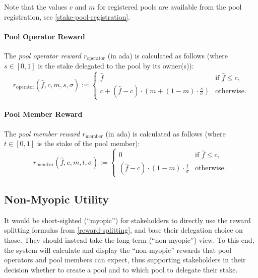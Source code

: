 \documentclass[11pt,a4paper,dvipsnames,twosided]{article}
\begin{document}
Note that the values \(c\) and \(m\) for registered pools are available
from the pool registration, see \cref{stake-pool-registration}.

\paragraph{Pool Operator Reward}
\label{pool-operator-reward}

The \emph{pool operator reward \(r_\mathrm{operator}\)} (in ada) is calculated
as follows (where \(s\in[0,1]\) is the stake delegated to the pool by its
owner(s)):
\[ r_\mathrm{operator}(\hat{f}, c, m, s, \sigma) := \left\{
    \begin{array}{ll}
        \displaystyle\hat{f} &
        \text{if $\hat{f}\leq c$,} \\
        \displaystyle c + (\hat{f} - c)\cdot\left(m + (1-m)\cdot\frac{s}{\sigma}\right) &
        \text{otherwise.}
    \end{array}
    \right.
\]

\paragraph{Pool Member Reward}
\label{pool-member-reward}

The \emph{pool member reward \(r_\mathrm{member}\)} (in ada) is
calculated as follows (where \(t\in[0,1]\) is the stake of the pool
member): \[
    r_\mathrm{member}(\hat{f}, c, m, t, \sigma) :=
    \left\{
    \begin{array}{ll}
        \displaystyle 0 &
        \text{if $\hat{f}\leq c$,} \\
        \displaystyle (\hat{f} - c)\cdot(1-m)\cdot\frac{t}{\sigma} &
        \text{otherwise.}
    \end{array}
    \right.
\]

\subsection{Non-Myopic Utility}
\label{non-myopic-utility}

It would be short-sighted (``myopic'') for stakeholders to directly use the
reward splitting formulas from \cref{reward-splitting}, and base their
delegation choice on those. They should instead take the long-term
(``non-myopic'') view. To this end, the system will calculate and display the
``non-myopic'' rewards that pool operators and pool members can expect, thus
supporting stakeholders in their decision whether to create a pool and to which
pool to delegate their stake.
\end{document}
